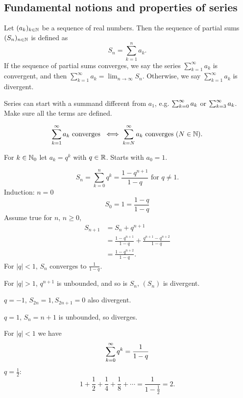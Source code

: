 \documentclass[10pt, a4paper]{article}
\newcommand{\dseq}[2][n]{(#2_#1)_{#1 \in \N}}
\begin{document}
\subsection{Fundamental notions and properties of series}

\begin{definition}
    Let $\dseq[k]{a}$ be a sequence of real numbers.
    Then the sequence of partial sums $\dseq{S}$ is defined as
    \[
    S_n = \sum_{k = 1}^{n}a_k.
    \]
    If the sequence of partial sums converges,
    we say the series $\sum_{k = 1}^{\infty}a_k$ is convergent,
    and then $\sum_{k = 1}^{\infty}a_k = \lim_{n \to \infty}S_n$.
    Otherwise,
    we say $\sum_{k = 1}^{\infty}a_k$ is divergent.
\end{definition}

\begin{remark}
    Series can start with a summand different from $a_1$,
    e.g.
    $\infsum[k = 0]a_k$ or $\infsum[k = 3]a_k$.
    Make sure all the terms are defined.
\end{remark}

\[
\infsum a_k\text{ converges } \iff \infsum[k = N]a_k\text{ converges } (N \in \N).
\]
\begin{example}
    For $k \in \N_0$ let $a_k = q ^ k$ with $q \in \R$.
    Starts with $a_0 = 1$.

    \[
    S_n = \sum_{k = 0}^{n}q ^ k = \frac{1 - q ^ {n + 1}}{1 - q}\text{ for } q \neq 1.
    \]
    Induction:
    $n = 0$
    \[
    S_0 = 1 = \frac{1 - q}{1 - q}
    \]
    Assume true for $n$, $n \geq 0$,
    \begin{align*}
        S_{n + 1} &= S_n + q ^ {n + 1} \\
        &= \frac{1 - q ^ {n + 1}}{1 - q} + \frac{q ^ {n + 1} - q ^ {n + 2}}{1 - q} \\
        &= \frac{1 - q ^ {n + 2}}{1 - q}.
    \end{align*}
    For $|q| < 1$,
    $S_n$ converges to $\frac{1}{1 - q}$.

    For $|q| > 1$,
    $q ^ {n + 1}$ is unbounded,
    and so is $S_n$,
    $(S_n)$ is divergent.

    $q = -1$,
    $S_{2n} = 1, S_{2n + 1} = 0$ also divergent.
    
    $q = 1$,
    $S_n = n + 1$ is unbounded,
    so diverges.

    For $|q| < 1$ we have
    \[
    \infsum[k = 0]q ^ k = \frac{1}{1 - q}
    \]
    $q = \frac{1}{2}$:
    \[
    1 + \frac{1}{2} + \frac{1}{4} + \frac{1}{8} + \dotsi = \frac{1}{1 - \frac{1}{2}} = 2.
    \]
\end{example}
\end{document}
